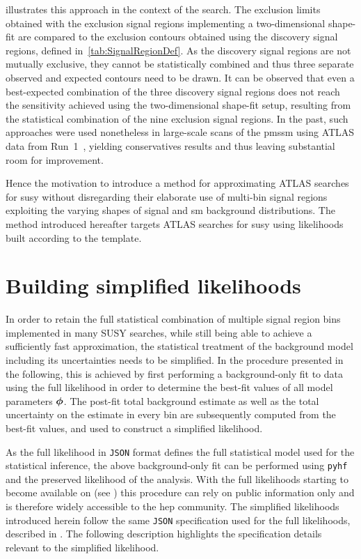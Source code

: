  illustrates this approach in the context of the \onelepton search. The exclusion limits obtained with the exclusion signal regions implementing a two-dimensional shape-fit are compared to the exclusion contours obtained using the discovery signal regions, defined in~\cref{tab:SignalRegionDef}.
As the discovery signal regions are not mutually exclusive, they cannot be statistically combined and thus three separate observed and expected contours need to be drawn. It can be observed that even a best-expected combination of the three discovery signal regions does not reach the sensitivity achieved using the two-dimensional shape-fit setup, resulting from the statistical combination of the nine exclusion signal regions.
In the past, such approaches were used nonetheless in large-scale scans of the \gls{pmssm} using ATLAS data from Run~1~\cite{pMSSM-scan-run1:2015baa,Aaboud:2016wna}, yielding conservatives results and thus leaving substantial room for improvement.

Hence the motivation to introduce a method for approximating ATLAS searches for \gls{susy} without disregarding their elaborate use of multi-bin signal regions exploiting the varying shapes of signal and \gls{sm} background distributions. The method introduced hereafter targets ATLAS searches for \gls{susy} using likelihoods built according to the  template.

\section{Building simplified likelihoods}\label{sec:building_simplified_likelihoods}

In order to retain the full statistical combination of multiple signal region bins implemented in many SUSY searches, while still being able to achieve a sufficiently fast approximation, the statistical treatment of the background model including its uncertainties needs to be simplified.
In the procedure presented in the following, this is achieved by first performing a background-only fit to data using the full likelihood in order to determine the best-fit values of all model parameters $\makemebold{\phi}$.
The post-fit total background estimate as well as the total uncertainty on the estimate in every bin are subsequently computed from the best-fit values, and used to construct a simplified likelihood.

As the full likelihood in \texttt{JSON} format defines the full statistical model used for the statistical inference, the above background-only fit can be performed using \texttt{pyhf} and the preserved likelihood of the analysis.
With the full likelihoods starting to become available on  (see \eg {}\cite{fullLH_1Lbb}) this procedure can rely on public information only and is therefore widely accessible to the \gls{hep} community.
The simplified likelihoods introduced herein follow the same \texttt{JSON} specification used for the full likelihoods, described in \cite{ATL-PHYS-PUB-2019-029}.
The following description highlights the specification details relevant to the simplified likelihood. 

